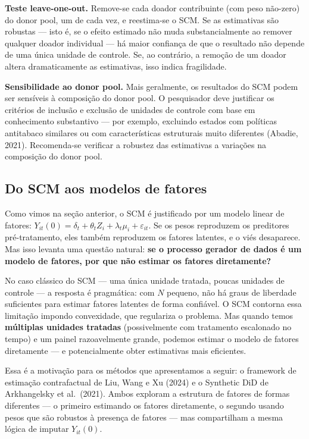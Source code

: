\documentclass[
]{article}
\begin{document}
\textbf{Teste leave-one-out.} Remove-se cada doador contribuinte (com peso não-zero) do donor pool, um de cada vez, e reestima-se o SCM. Se as estimativas são robustas --- isto é, se o efeito estimado não muda substancialmente ao remover qualquer doador individual --- há maior confiança de que o resultado não depende de uma única unidade de controle. Se, ao contrário, a remoção de um doador altera dramaticamente as estimativas, isso indica fragilidade.

\textbf{Sensibilidade ao donor pool.} Mais geralmente, os resultados do SCM podem ser sensíveis à composição do donor pool. O pesquisador deve justificar os critérios de inclusão e exclusão de unidades de controle com base em conhecimento substantivo --- por exemplo, excluindo estados com políticas antitabaco similares ou com características estruturais muito diferentes (Abadie, 2021). Recomenda-se verificar a robustez das estimativas a variações na composição do donor pool.

\subsection{Do SCM aos modelos de fatores}\label{do-scm-aos-modelos-de-fatores}

Como vimos na seção anterior, o SCM é justificado por um modelo linear de fatores: \(Y_{it}(0) = \delta_t + \theta_t Z_i + \lambda_t \mu_i + \varepsilon_{it}\). Se os pesos reproduzem os preditores pré-tratamento, eles também reproduzem os fatores latentes, e o viés desaparece. Mas isso levanta uma questão natural: \textbf{se o processo gerador de dados é um modelo de fatores, por que não estimar os fatores diretamente?}

No caso clássico do SCM --- uma única unidade tratada, poucas unidades de controle --- a resposta é pragmática: com \(N\) pequeno, não há graus de liberdade suficientes para estimar fatores latentes de forma confiável. O SCM contorna essa limitação impondo convexidade, que regulariza o problema. Mas quando temos \textbf{múltiplas unidades tratadas} (possivelmente com tratamento escalonado no tempo) e um painel razoavelmente grande, podemos estimar o modelo de fatores diretamente --- e potencialmente obter estimativas mais eficientes.

Essa é a motivação para os métodos que apresentamos a seguir: o framework de estimação contrafactual de Liu, Wang e Xu (2024) e o Synthetic DiD de Arkhangelsky et al.~(2021). Ambos exploram a estrutura de fatores de formas diferentes --- o primeiro estimando os fatores diretamente, o segundo usando pesos que são robustos à presença de fatores --- mas compartilham a mesma lógica de imputar \(Y_{it}(0)\).
\end{document}
